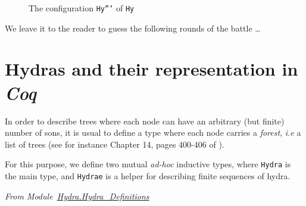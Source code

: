 \begin{figure}[hp]
\caption{The configuration \texttt{Hy'''} of \texttt{Hy} \label{fig:Hy5}}
\end{figure}
\FloatBarrier

We leave it to the reader  to guess the following  rounds of the battle \dots



\section{Hydras and their representation in \emph{Coq}}
\label{sec:orgheadline48}



In order to describe trees where each node can have an arbitrary (but finite) number of sons, it is usual to define a type where each node carries a \emph{forest}, \emph{i.e} a list of trees
(see for instance Chapter 14, pages 400-406 of \cite{BC04}).

For this purpose, we define two mutual \emph{ad-hoc}  inductive types, where \texttt{Hydra} is the main type, and \texttt{Hydrae} is a helper for describing finite sequences of hydra.
\label{types:Hydra}
\label{types:Hydrae}

\vspace{4pt}
\noindent
\emph{From Module~\href{../theories/html/hydras.Hydra.Hydra_Definitions.html\#Hydra}{Hydra.Hydra\_Definitions}}

